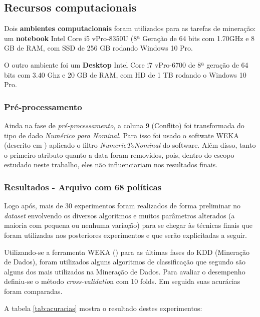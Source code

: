 \subsection{Recursos computacionais}
Dois \textbf{ambientes computacionais} foram utilizados para as tarefas de mineração: um \textbf{notebook}  Intel Core i5 vPro-8350U (8ª Geração de 64 bits com 1.70GHz e 8 GB de RAM, com SSD de 256 GB rodando Windows 10 Pro.
 
O outro ambiente foi um \textbf{Desktop} Intel Core i7 vPro-6700 de 8ª geração de 64 bits com 3.40 Ghz e 20 GB de RAM, com HD de 1 TB rodando o Windows 10 Pro.

\subsubsection{Pré-processamento}
Ainda na fase de \textit{pré-processamento}, a coluna 9 (Conflito) foi transformada do tipo de dado \textit{Numérico para Nominal}. Para isso foi usado o softwate WEKA (descrito em \cite{eibe2016}) aplicado o filtro \textit{NumericToNominal} do software. Além disso, tanto o primeiro atributo quanto a data foram removidos, pois, dentro do escopo estudado neste trabalho, eles não influenciariam nos resultados finais.

\subsubsection{Resultados - Arquivo com 68 políticas}
Logo após, mais de 30 experimentos foram realizados de forma preliminar no \textit{dataset} envolvendo os diversos algoritmos e muitos parâmetros alterados (a maioria com pequena ou nenhuma variação) para se chegar às técnicas finais que foram utilizadas nos posteriores experimentos e que serão explicitadas a seguir.

Utilizando-se a ferramenta WEKA (\cite{eibe2016}) para as últimas fases do KDD (Mineração de Dados), foram utilizados alguns algoritmos de classificação que segundo \cite{wu2007} são alguns dos mais utilizados na Mineração de Dados. Para avaliar o desempenho definiu-se o método \textit{cross-validatio}n com 10 folds. Em seguida suas acurácias foram comparadas.

A tabela \ref{tab:acuracias} mostra o resultado destes experimentos:

